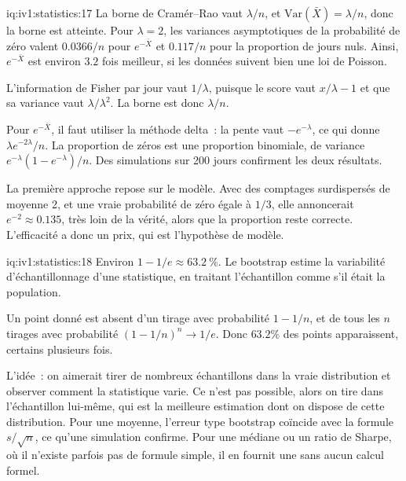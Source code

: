 \begin{solution}{iq:iv1:statistics:17}
La borne de Cramér--Rao vaut $\lambda/n$, et $\mathrm{Var}(\bar{X}) = \lambda/n$, donc la borne est atteinte. Pour $\lambda = 2$, les variances asymptotiques de la probabilité de zéro valent $0.0366/n$ pour $e^{-\bar{X}}$ et $0.117/n$ pour la proportion de jours nuls. Ainsi, $e^{-\bar{X}}$ est environ $3.2$ fois meilleur, si les données suivent bien une loi de Poisson.

L'information de Fisher par jour vaut $1/\lambda$, puisque le score vaut $x/\lambda - 1$ et que sa variance vaut $\lambda/\lambda^2$. La borne est donc $\lambda/n$.

Pour $e^{-\bar{X}}$, il faut utiliser la méthode delta~: la pente vaut $-e^{-\lambda}$, ce qui donne $\lambda e^{-2\lambda}/n$. La proportion de zéros est une proportion binomiale, de variance $e^{-\lambda}(1 - e^{-\lambda})/n$. Des simulations sur 200 jours confirment les deux résultats.

La première approche repose sur le modèle. Avec des comptages surdispersés de moyenne 2, et une vraie probabilité de zéro égale à $1/3$, elle annoncerait $e^{-2} \approx 0.135$, très loin de la vérité, alors que la proportion reste correcte. L'efficacité a donc un prix, qui est l'hypothèse de modèle.

\end{solution}

\begin{solution}{iq:iv1:statistics:18}
Environ $1 - 1/e \approx 63.2~\%$. Le bootstrap estime la variabilité d'échantillonnage d'une statistique, en traitant l'échantillon comme s'il était la population.

Un point donné est absent d'un tirage avec probabilité $1 - 1/n$, et de tous les $n$ tirages avec probabilité $(1 - 1/n)^n \to 1/e$. Donc $63.2\%$ des points apparaissent, certains plusieurs fois.

L'idée~: on aimerait tirer de nombreux échantillons dans la vraie distribution et observer comment la statistique varie. Ce n'est pas possible, alors on tire dans l'échantillon lui-même, qui est la meilleure estimation dont on dispose de cette distribution. Pour une moyenne, l'erreur type bootstrap coïncide avec la formule $s/\sqrt{n}$, ce qu'une simulation confirme. Pour une médiane ou un ratio de Sharpe, où il n'existe parfois pas de formule simple, il en fournit une sans aucun calcul formel.

\end{solution}

